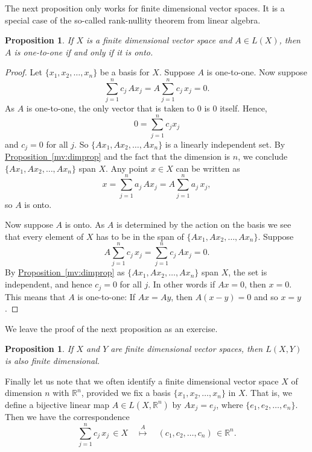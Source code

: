 \documentclass[12pt]{book}
\newcommand{\R}{{\mathbb{R}}}
\theoremstyle{plain}
\newtheorem{prop}[thm]{Proposition}
\theoremstyle{remark}
\theoremstyle{definition}
\theoremstyle{exercise}
\theoremstyle{example}
\newcommand{\propref}[1]{\hyperref[#1]{Proposition~\ref*{#1}}}
\begin{document}
The next proposition only works for finite dimensional vector spaces.
It is a special case of the so-called rank-nullity theorem from linear
algebra.

\begin{prop} \label{mv:prop:lin11onto}
If $X$ is a finite dimensional vector space and $A \in L(X)$, then $A$ is one-to-one if and only if it is onto.
\end{prop}

\begin{proof}
Let $\{ x_1,x_2,\ldots,x_n \}$ be a basis for $X$.
Suppose $A$ is one-to-one.  Now suppose
\begin{equation*}
\sum_{j=1}^n c_j \, Ax_j =
A\sum_{j=1}^n c_j \, x_j =
0 .
\end{equation*}
As $A$ is one-to-one,
the only vector that is taken to 0 is 0 itself.  
Hence,
\begin{equation*}
0 =
\sum_{j=1}^n c_j x_j
\end{equation*}
and $c_j = 0$ for all $j$.
So $\{ Ax_1, Ax_2, \ldots, Ax_n \}$ is a linearly independent set.
By \propref{mv:dimprop}
and the fact that the dimension is $n$, we conclude
$\{ Ax_1, Ax_2, \ldots, Ax_n \}$ span $X$.  Any point $x \in X$
can be written as
\begin{equation*}
x = \sum_{j=1}^n a_j \, Ax_j =
A\sum_{j=1}^n a_j \, x_j ,
\end{equation*}
so $A$ is onto.

Now suppose $A$ is onto.  As $A$ is determined by the action on
the basis we see that every element of $X$ has to be in the span of
$\{ Ax_1, Ax_2, \ldots, Ax_n \}$.  Suppose 
\begin{equation*}
A\sum_{j=1}^n c_j \, x_j =
\sum_{j=1}^n c_j \, Ax_j = 0 .
\end{equation*}
By \propref{mv:dimprop}
as $\{ Ax_1, Ax_2, \ldots, Ax_n \}$ span $X$, the set is independent,
and hence $c_j = 0$ for all $j$.  In other words if $Ax = 0$, then $x=0$.  This means that
$A$ is one-to-one:  If $Ax = Ay$, then $A(x-y) = 0$ and so
$x=y$.
\end{proof}

We leave the proof of the next proposition as an exercise.

\begin{prop} \label{prop:LXYfinitedim}
If $X$ and $Y$ are finite dimensional vector spaces, then $L(X,Y)$
is also finite dimensional.
\end{prop}

Finally let us note that we often identify a finite dimensional vector
space $X$ of dimension $n$ with $\R^n$, provided we fix a basis $\{ x_1,
x_2, \ldots, x_n \}$ in $X$.  That is, we define a bijective
linear map $A \in L(X,\R^n)$ by
$Ax_j = e_j$, where $\{ e_1, e_2, \ldots, e_n \}$.  Then we have
the correspondence
\begin{equation*}
\sum_{j=1}^n c_j \, x_j \, \in X
\quad
\overset{A}{\mapsto}
\quad
(c_1,c_2,\ldots,c_n) \, \in \R^n .
\end{equation*}
\end{document}
